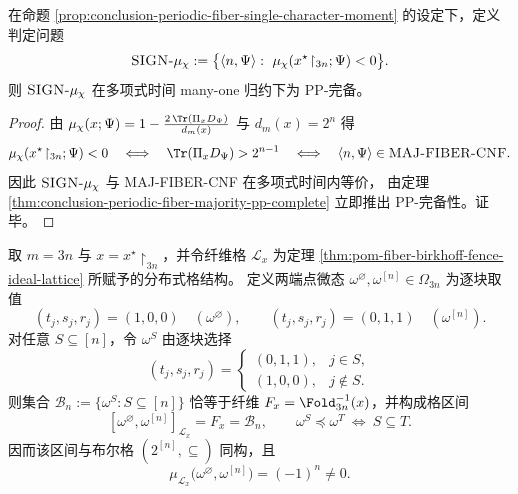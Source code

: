 \begin{proposition}\label{prop:conclusion-periodic-fiber-sign-muchi-pp-complete}
在命题 \ref{prop:conclusion-periodic-fiber-single-character-moment} 的设定下，定义判定问题
\[
\text{\normalfont\textsc{SIGN-}}\mu_\chi
:=
\bigl\{\langle n,\Psi\rangle:\ \mu_\chi(x^\star\!\upharpoonright_{3n};\Psi)<0\bigr\}.
\]
则 \(\text{\normalfont\textsc{SIGN-}}\mu_\chi\) 在多项式时间 many-one 归约下为 \(\mathrm{PP}\)-完备。
\end{proposition}
\begin{proof}
由 \(\mu_\chi(x;\Psi)=1-\frac{2\,\Tr(\Pi_xD_\Psi)}{d_m(x)}\) 与 \(d_m(x)=2^n\) 得
\[
\mu_\chi(x^\star\!\upharpoonright_{3n};\Psi)<0
\quad\Longleftrightarrow\quad
\Tr(\Pi_xD_\Psi)>2^{n-1}
\quad\Longleftrightarrow\quad
\langle n,\Psi\rangle\in \textsc{MAJ-FIBER-CNF}.
\]
因此 \(\textsc{SIGN-}\mu_\chi\) 与 \textsc{MAJ-FIBER-CNF} 在多项式时间内等价，
由定理 \ref{thm:conclusion-periodic-fiber-majority-pp-complete} 立即推出 \(\mathrm{PP}\)-完备性。证毕。
\end{proof}

\begin{proposition}\label{prop:conclusion-periodic-fiber-boolean-interval-mobius}
取 \(m=3n\) 与 \(x=x^\star\!\upharpoonright_{3n}\)，并令纤维格 \(\mathcal L_x\) 为定理 \ref{thm:pom-fiber-birkhoff-fence-ideal-lattice} 所赋予的分布式格结构。
定义两端点微态 \(\omega^{\varnothing},\omega^{[n]}\in\Omega_{3n}\) 为逐块取值
\[
(t_j,s_j,r_j)=(1,0,0)\quad(\omega^{\varnothing}),
\qquad
(t_j,s_j,r_j)=(0,1,1)\quad(\omega^{[n]}).
\]
对任意 \(S\subseteq[n]\)，令 \(\omega^{S}\) 由逐块选择
\[
(t_j,s_j,r_j)=
\begin{cases}
(0,1,1),& j\in S,\\
(1,0,0),& j\notin S.
\end{cases}
\]
则集合
\(
\mathcal B_n:=\{\omega^{S}:S\subseteq[n]\}
\)
恰等于纤维 \(F_x=\Fold_{3n}^{-1}(x)\)，并构成格区间
\[
[\omega^{\varnothing},\omega^{[n]}]_{\mathcal L_x}=F_x=\mathcal B_n,
\qquad
\omega^{S}\preceq \omega^{T}\ \Longleftrightarrow\ S\subseteq T.
\]
因而该区间与布尔格 \((2^{[n]},\subseteq)\) 同构，且
\[
\mu_{\mathcal L_x}\!\bigl(\omega^{\varnothing},\omega^{[n]}\bigr)=(-1)^n\neq 0.
\]
\end{proposition}

